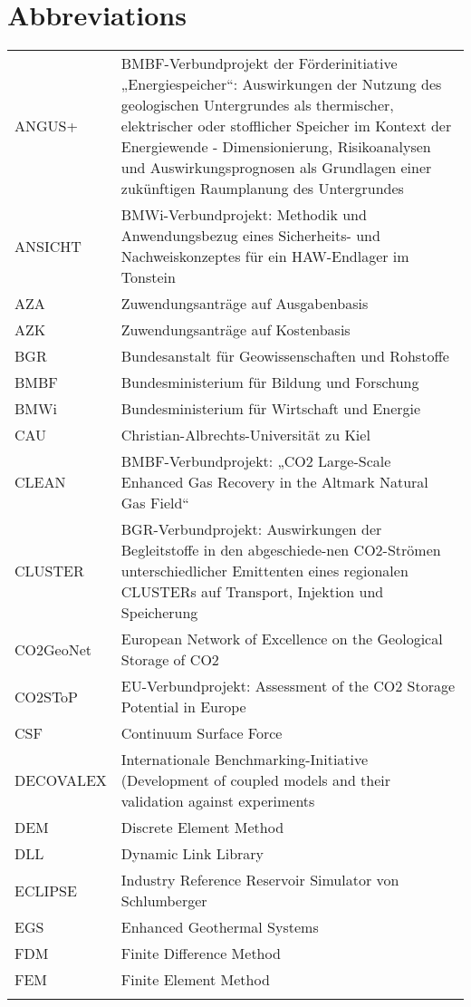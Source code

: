 \section{Abbreviations}


\small
\begin{longtable}{p{2cm}p{9.5cm}}
ANGUS+ & BMBF-Verbundprojekt der Förderinitiative „Energiespeicher“: Auswirkungen der Nutzung des geologischen Untergrundes als thermischer, elektrischer oder stofflicher Speicher im Kontext der Energiewende - Dimensionierung, Risikoanalysen und Auswirkungsprognosen als Grundlagen einer zukünftigen Raumplanung des Untergrundes \\
%
ANSICHT & BMWi-Verbundprojekt: Methodik und Anwendungsbezug eines Sicherheits- und Nachweiskonzeptes für ein HAW-Endlager im Tonstein \\
%
AZA & Zuwendungsanträge auf Ausgabenbasis \\
%
AZK & Zuwendungsanträge auf Kostenbasis \\
%
BGR & Bundesanstalt für Geowissenschaften und Rohstoffe \\
%
BMBF & Bundesministerium für Bildung und Forschung \\
%
BMWi & Bundesministerium für Wirtschaft und Energie \\
%
CAU & Christian-Albrechts-Universität zu Kiel \\
%
CLEAN & BMBF-Verbundprojekt: „CO2 Large-Scale Enhanced Gas Recovery in the Altmark Natural Gas Field“ \\
%
CLUSTER & BGR-Verbundprojekt: Auswirkungen der Begleitstoffe in den abgeschiede-nen CO2-Strömen unterschiedlicher Emittenten eines regionalen CLUSTERs auf Transport, Injektion und Speicherung \\
%
CO2GeoNet & European Network of Excellence on the Geological Storage of CO2 \\
%
CO2SToP & EU-Verbundprojekt: Assessment of the CO2 Storage Potential in Europe \\
%
CSF & Continuum Surface Force \\
%
DECOVALEX & Internationale Benchmarking-Initiative (Development of coupled models and their validation against experiments \\
%
DEM & Discrete Element Method \\
%
DLL & Dynamic Link Library \\
%
ECLIPSE & Industry Reference Reservoir Simulator von Schlumberger \\
%
EGS & Enhanced Geothermal Systems \\
%
FDM & Finite Difference Method \\
%
FEM & Finite Element Method \\
%
 &  \\
\end{longtable}
\normalsize

 
 
 
 
 